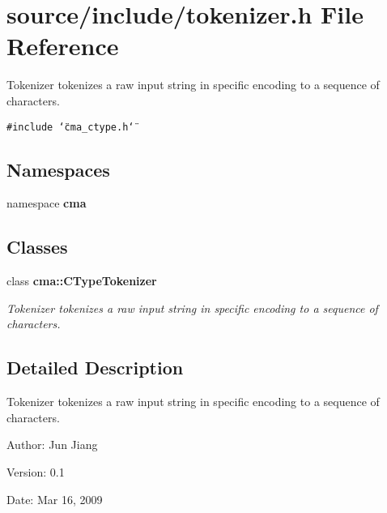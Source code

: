 \section{source/include/tokenizer.h File Reference}
\label{tokenizer_8h}
Tokenizer tokenizes a raw input string in specific encoding to a sequence of characters. 

{\tt \#include \char`\"{}cma\_\-ctype.h\char`\"{}}\par
\subsection*{Namespaces}
\begin{CompactItemize}
\item 
namespace \textbf{cma}
\end{CompactItemize}
\subsection*{Classes}
\begin{CompactItemize}
\item 
class {\bf cma::CTypeTokenizer}
\begin{CompactList}\small\item\em Tokenizer tokenizes a raw input string in specific encoding to a sequence of characters. \item\end{CompactList}\end{CompactItemize}


\subsection{Detailed Description}
Tokenizer tokenizes a raw input string in specific encoding to a sequence of characters. 

\begin{Desc}
\item[Author:]Jun Jiang \end{Desc}
\begin{Desc}
\item[Version:]0.1 \end{Desc}
\begin{Desc}
\item[Date:]Mar 16, 2009 \end{Desc}
